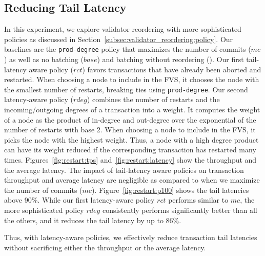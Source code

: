 \subsection{Reducing Tail Latency}
\label{subsec:experiment:policy}

In this experiment, we explore validator reordering with more sophisticated policies as discussed in Section~\ref{subsec:validator_reordering:policy}.
Our baselines are the \texttt{prod-degree} policy that maximizes the number of commits ($mc$) as well as no batching ($base$) and batching without reordering (). 
Our first tail-latency aware policy ($rct$) favors transactions that have already been aborted and restarted. When choosing a node to include in the FVS, it chooses the node with the smallest number of restarts, breaking ties using \texttt{prod-degree}.
Our second latency-aware policy ($rdeg$) combines the number of restarts and the incoming/outgoing degrees of a transaction into a weight. It computes the weight of a node as
the product of in-degree and out-degree over the exponential of the number of
restarts with base 2. When choosing a node to include in the FVS, it picks the node with the highest weight. Thus, a node with a high degree product can have its weight reduced if the corresponding transaction has restarted many times.
Figures~\ref{fig:restart:tps} and~\ref{fig:restart:latency} show the throughput
and the average latency. The impact of tail-latency aware policies on transaction throughput and average latency are negligible as compared to when we maximize the number of commits ($mc$).
Figure~\ref{fig:restart:p100} shows the 
tail latencies above 90\%. 
While our first latency-aware policy $rct$ performs similar to $mc$, the more sophisticated policy $rdeg$ consistently performs significantly better than all the others, and it reduces the tail latency by up to 86\%.

Thus, with latency-aware policies, we effectively reduce transaction tail latencies without sacrificing either the throughput or the average latency.

